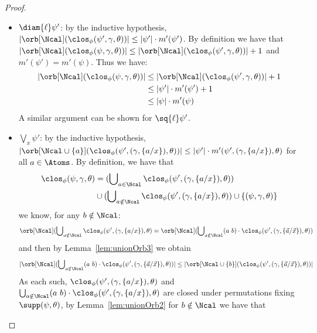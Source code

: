 \begin{proof}
\begin{enumerate}
\begin{itemize}
			As, for $i \in \{1,2\}$, $\|\psi_i\| \le \|\psi\|$ we have $m'(\psi_i) \le m'(\psi)$. 
			Thus we have:
			\begin{align*}
				|\orb[\Ncal](\clos_\phi(\psi_1 \lor \psi_2,\gamma, \theta))| &\le |\orb[\Ncal](\clos_\phi(\psi_1, \gamma, \theta))| + |\orb[\Ncal](\clos_\phi(\psi_2,\gamma, \theta))| 
				\\&\le (|\psi_1|\cdot m'(\psi_1)) + (|\psi_2|\cdot m'(\psi_2)) \le |\psi|\cdot m(\psi)
			\end{align*}			A similar argument can be shown for $\psi_1 \land \psi_2$.
						\item $\diam{\ell}\psi'$: by the inductive hypothesis, $|\orb[\Ncal](\clos_\phi(\psi', \gamma, \theta))| \le |\psi'|\cdot m'(\psi')$.
			By definition
			we have that $|\orb[\Ncal](\clos_\phi(\psi, \gamma, \theta))| \le |\orb[\Ncal](\clos_\phi(\psi',\gamma,\theta))| + 1$ and $m'(\psi') = m'(\psi)$.
						Thus we have:
			\begin{align*}
				|\orb[\Ncal](\clos_\phi(\psi,\gamma,\theta))| &\le |\orb[\Ncal](\clos_\phi(\psi',\gamma,\theta))| + 1
				\\&\le |\psi'|\cdot m'(\psi') + 1 
				\\&\le |\psi|\cdot m'(\psi)
			\end{align*}
			A similar argument can be shown for $\sq{\ell}\psi'$.
						\item $\bigvee_x \psi'$: by the inductive hypothesis, $|\orb[\Ncal \cup \{a\}](\clos_\phi(\psi',(\gamma, \{a/x\}), \theta))| \le |\psi'|\cdot m'(\psi',(\gamma, \{a/x\}),\theta)$ for all $a \in \Atoms$.
			By definition, we have that 
						\begin{align*}
				\clos_\phi(\psi,\gamma, \theta) &= (\bigcup\nolimits_{a \in \Ncal} \clos_\phi(\psi',(\gamma, \{a/x\}), \theta))\\ &\cup (\bigcup\nolimits_{a \notin \Ncal} \clos_\phi(\psi',(\gamma, \{a/x\}), \theta)) \cup \{(\psi,\gamma, \theta)\}
			\end{align*}
			we know, for any $b \notin \Ncal$:
						\[
			\orb[\Ncal](\bigcup\nolimits_{a \notin \Ncal} \clos_\phi(\psi',(\gamma, \{a/x\}), \theta) = \orb[\Ncal](\bigcup\nolimits_{a \notin \Ncal} (a\ b) \cdot \clos_\phi(\psi',(\gamma, \{\vec a / \vec x\}), \theta))
			\]
						and then by Lemma~\ref{lem:unionOrb3} we obtain 
			\[
			|\orb[\Ncal](\bigcup\nolimits_{a \notin \Ncal} (a\ b) \cdot \clos_\phi(\psi',(\gamma, \{\vec a / \vec x\}), \theta))| \le |\orb[\Ncal \cup \{b\}](\clos_\phi(\psi',(\gamma, \{\vec a / \vec x\}), \theta))|
			\]
			As each such, $\clos_\phi(\psi',(\gamma, \{a/x\}), \theta)$ and $\bigcup\nolimits_{a \notin \Ncal} (a\ b) \cdot\clos_\phi(\psi',(\gamma, \{ a /  x\}), \theta)$ are closed under permutations fixing $\supp(\psi,\theta)$, by Lemma~\ref{lem:unionOrb2} for $b \notin \Ncal$ we have that 

\end{itemize}
\end{enumerate}
\end{proof}

